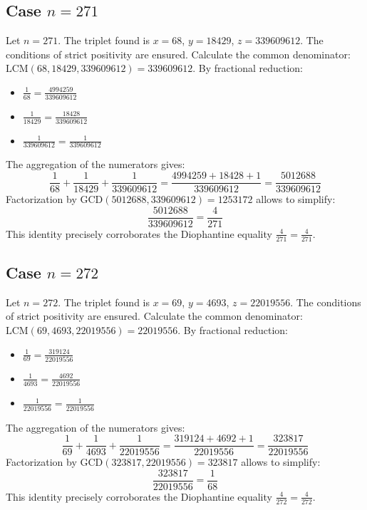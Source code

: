 \documentclass[11pt,a4paper]{article}
\begin{document}
\subsection{Case $n = 271$}
Let $n = 271$. The triplet found is $x = 68$, $y = 18429$, $z = 339609612$.
The conditions of strict positivity are ensured.
Calculate the common denominator: $\text{LCM}(68, 18429, 339609612) = 339609612$.
By fractional reduction:
\begin{itemize}
    \item $\frac{1}{68} = \frac{4994259}{339609612}$
    \item $\frac{1}{18429} = \frac{18428}{339609612}$
    \item $\frac{1}{339609612} = \frac{1}{339609612}$
\end{itemize}
The aggregation of the numerators gives:
$$ \frac{1}{68} + \frac{1}{18429} + \frac{1}{339609612} = \frac{4994259 + 18428 + 1}{339609612} = \frac{5012688}{339609612} $$
Factorization by $\text{GCD}(5012688, 339609612) = 1253172$ allows to simplify:
$$ \frac{5012688}{339609612} = \frac{4}{271} $$
This identity precisely corroborates the Diophantine equality $\frac{4}{271} = \frac{4}{271}$.

\subsection{Case $n = 272$}
Let $n = 272$. The triplet found is $x = 69$, $y = 4693$, $z = 22019556$.
The conditions of strict positivity are ensured.
Calculate the common denominator: $\text{LCM}(69, 4693, 22019556) = 22019556$.
By fractional reduction:
\begin{itemize}
    \item $\frac{1}{69} = \frac{319124}{22019556}$
    \item $\frac{1}{4693} = \frac{4692}{22019556}$
    \item $\frac{1}{22019556} = \frac{1}{22019556}$
\end{itemize}
The aggregation of the numerators gives:
$$ \frac{1}{69} + \frac{1}{4693} + \frac{1}{22019556} = \frac{319124 + 4692 + 1}{22019556} = \frac{323817}{22019556} $$
Factorization by $\text{GCD}(323817, 22019556) = 323817$ allows to simplify:
$$ \frac{323817}{22019556} = \frac{1}{68} $$
This identity precisely corroborates the Diophantine equality $\frac{4}{272} = \frac{4}{272}$.
\end{document}
